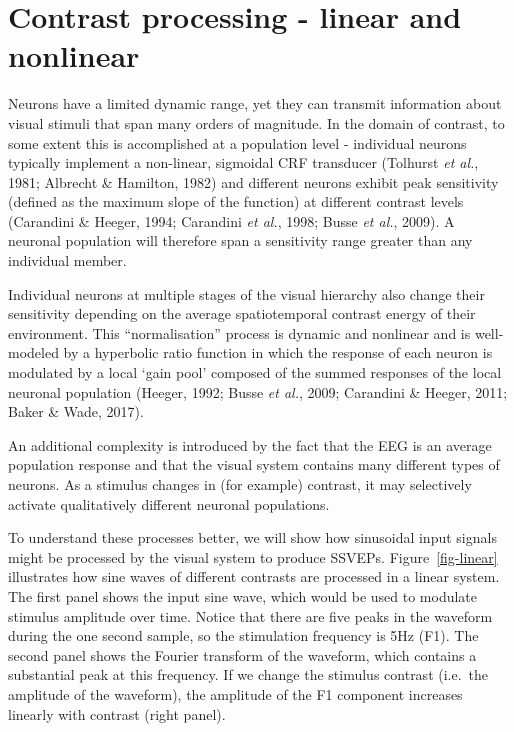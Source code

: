 \documentclass[
  letterpaper,
  DIV=11,
  numbers=noendperiod]{scrartcl}
\begin{document}
\section{Contrast processing - linear and
nonlinear}\label{contrast-processing---linear-and-nonlinear}

Neurons have a limited dynamic range, yet they can transmit information
about visual stimuli that span many orders of magnitude. In the domain
of contrast, to some extent this is accomplished at a population level -
individual neurons typically implement a non-linear, sigmoidal CRF
transducer (Tolhurst \emph{et al.}, 1981; Albrecht \& Hamilton, 1982)
and different neurons exhibit peak sensitivity (defined as the maximum
slope of the function) at different contrast levels (Carandini \&
Heeger, 1994; Carandini \emph{et al.}, 1998; Busse \emph{et al.}, 2009).
A neuronal population will therefore span a sensitivity range greater
than any individual member.

Individual neurons at multiple stages of the visual hierarchy also
change their sensitivity depending on the average spatiotemporal
contrast energy of their environment. This ``normalisation'' process is
dynamic and nonlinear and is well-modeled by a hyperbolic ratio function
in which the response of each neuron is modulated by a local `gain pool'
composed of the summed responses of the local neuronal population
(Heeger, 1992; Busse \emph{et al.}, 2009; Carandini \& Heeger, 2011;
Baker \& Wade, 2017).

An additional complexity is introduced by the fact that the EEG is an
average population response and that the visual system contains many
different types of neurons. As a stimulus changes in (for example)
contrast, it may selectively activate qualitatively different neuronal
populations.

To understand these processes better, we will show how sinusoidal input
signals might be processed by the visual system to produce SSVEPs.
Figure~\ref{fig-linear} illustrates how sine waves of different
contrasts are processed in a linear system. The first panel shows the
input sine wave, which would be used to modulate stimulus amplitude over
time. Notice that there are five peaks in the waveform during the one
second sample, so the stimulation frequency is 5Hz (F1). The second
panel shows the Fourier transform of the waveform, which contains a
substantial peak at this frequency. If we change the stimulus contrast
(i.e.~the amplitude of the waveform), the amplitude of the F1 component
increases linearly with contrast (right panel).
\end{document}
